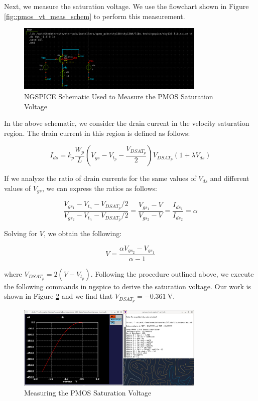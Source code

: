 \documentclass{article}
\begin{document}
	Next, we measure the saturation voltage. We use the flowchart shown in Figure \ref{fig::pmos_vt_meas_schem} to perform this measurement.
	
	\begin{figure}[H]
		\centerline{\includegraphics[width=0.8\textwidth]{pmos_vdsat_meas_schem.png}}
		\caption{NGSPICE Schematic Used to Measure the PMOS Saturation Voltage}
		\label{fig::pmos_vdsat_meas_schem}
	\end{figure}
	
	 \noindent In the above schematic, we consider the drain current in the velocity saturation region. The drain current in this region is defined as follows:
	
	\begin{equation}
		\label{eq::pmos_sat_current}
		I_{ds} = k_p\frac{W_p}{L}\left(V_{gs} - V_{t_p} - \frac{V_{DSAT_p}}{2}\right)V_{DSAT_p}(1 + {\lambda}V_{ds})
	\end{equation}
	
	\noindent If we analyze the ratio of drain currents for the same values of $V_{ds}$ and different values of $V_{gs}$, we can express the ratios as follows:
	
	\begin{equation}
		\frac{V_{gs_1} - V_{t_n} - V_{DSAT_p}/2}{V_{gs_2} - V_{t_n} - V_{DSAT_p}/2} = \frac{V_{gs_1} - V}{V_{gs_2} - V} = \frac{I_{ds_1}}{I_{ds_2}} = \alpha
	\end{equation}
	
	\noindent Solving for $V$, we obtain the following:
	
	\begin{equation}
		V = \frac{{\alpha}V_{gs_2} - V_{gs_1}}{\alpha - 1}
	\end{equation}
	
	\noindent where $V_{DSAT_p} = 2(V - V_{t_p})$. Following the procedure outlined above, we execute the following commands in ngspice to derive the saturation voltage. Our work is shown in Figure \ref{fig::pmos_vdsat_meas} and we find that $V_{DSAT_p} = -0.361\ \text{V}$.
	
	\begin{figure}[H]
		\centerline{\includegraphics[width=0.8\textwidth]{pmos_vdsat_meas.png}}
		\caption{Measuring the PMOS Saturation Voltage}
		\label{fig::pmos_vdsat_meas}
	\end{figure}
	
\end{document}
